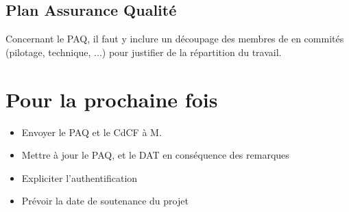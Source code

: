 \documentclass[11pt,fleqn]{report}
\begin{document}

\subsection{Plan Assurance Qualité}

Concernant le PAQ, il faut y inclure un découpage des membres de \amo en commités (pilotage, technique, ...) pour justifier de la répartition du travail.



\section{Pour la prochaine fois}

\begin{itemize}
    \item Envoyer le PAQ et le CdCF à M. \Agopian
    \item Mettre à jour le PAQ, et le DAT en conséquence des remarques
    \item Expliciter l'authentification
    \item Prévoir la date de soutenance du projet
\end{itemize}

\end{document}

